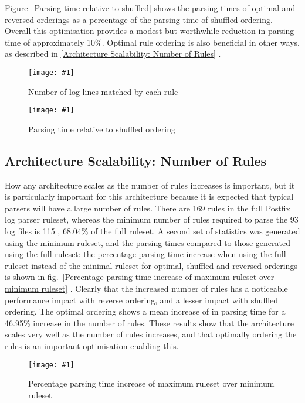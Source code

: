\documentclass{svmult}
\newcommand{\showgraph}[3]{%
    \begin{figure}[btp]%
        \texttt{[image: \#1]}%
        \caption{#2}\label{#3}%
    \end{figure}%
}
\newcommand{\sectionref}[1]{%
    \textsection{}\vref*{#1}%
}
\newcommand{\refwithlabel}[2]{%
    #1~\vref{#2}%
}
\newcommand{\graphref}[1]{%
    \refwithlabel{fig.}{#1}%
}
\newcommand{\Graphref}[1]{%
    \refwithlabel{Figure}{#1}%
}
\newcommand{\numberOFlogFILES}[0]{%
    93%
}
\newcommand{\numberOFrules}[0]{%
    169%
}
\newcommand{\numberOFrulesMINIMUM}[0]{%
    115%
}
\newcommand{\numberOFrulesMINIMUMpercentage}[0]{%
    68.04\%%
}
\newcommand{\numberOFrulesMAXIMUMpercentage}[0]{%
    46.95\%%
}
\begin{document}
\Graphref{Parsing time relative to shuffled} shows the parsing times of
optimal and reversed orderings as a percentage of the parsing time of
shuffled ordering.  Overall this optimisation provides a modest but
worthwhile reduction in parsing time of approximately 10\%.  Optimal rule
ordering is also beneficial in other ways, as described in
\sectionref{Architecture Scalability: Number of Rules}.
\showgraph{build/graph-hits}{Number of log lines matched by each rule}{rule
hits graph} \showgraph{build/graph-optimal-and-reverse-vs-shuffle}{Parsing
time relative to shuffled ordering}{Parsing time relative to shuffled}

\subsection{Architecture Scalability: Number of Rules}

\label{Architecture Scalability: Number of Rules}

How any architecture scales as the number of rules increases is important,
but it is particularly important for this architecture because it is
expected that typical parsers will have a large number of rules.  There are
\numberOFrules{} rules in the full Postfix log parser ruleset, whereas the
minimum number of rules required to parse the \numberOFlogFILES{} log files
is \numberOFrulesMINIMUM{}, \numberOFrulesMINIMUMpercentage{} of the full
ruleset.  A second set of statistics was generated using the minimum
ruleset, and the parsing times compared to those generated using the full
ruleset: the percentage parsing time increase when using the full ruleset
instead of the minimal ruleset for optimal, shuffled and reversed orderings
is shown in \graphref{Percentage parsing time increase of maximum ruleset
over minimum ruleset}.  Clearly that the increased number of rules has
a noticeable performance impact with reverse ordering, and a lesser impact
with shuffled ordering.  The optimal ordering shows a mean increase of
 in parsing time for a
\numberOFrulesMAXIMUMpercentage{} increase in the number of rules.  These
results show that the architecture scales very well as the number of rules
increases, and that optimally ordering the rules is an important
optimisation enabling this.
\showgraph{build/graph-full-ruleset-vs-minimum-ruleset}{Percentage parsing
time increase of maximum ruleset over minimum ruleset}{Percentage parsing
time increase of maximum ruleset over minimum ruleset}
\end{document}
